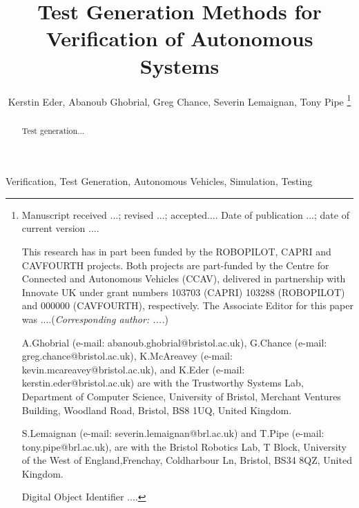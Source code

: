 \documentclass[letterpaper, 10 pt, journal, twoside]{IEEEtran}
\begin{document}
\title{Test Generation Methods for Verification of Autonomous Systems}

\author{Kerstin Eder, Abanoub Ghobrial, Greg Chance, Severin Lemaignan, Tony Pipe  
\thanks{{\footnotesize
Manuscript  
received ...;
revised ...;  
accepted.... 
Date of publication ...;
date of current version ....

This research has in part been funded by the ROBOPILOT, CAPRI and CAVFOURTH projects. Both projects are part-funded by the Centre for Connected and Autonomous Vehicles (CCAV), delivered in partnership with Innovate UK under grant numbers 103703 (CAPRI) 103288 (ROBOPILOT) and 000000 (CAVFOURTH), respectively.
The Associate Editor for this paper was ....(\textit{Corresponding author: ....})

A.Ghobrial (e-mail: abanoub.ghobrial@bristol.ac.uk), 
G.Chance (e-mail: greg.chance@bristol.ac.uk), 
K.McAreavey (e-mail: kevin.mcareavey@bristol.ac.uk), 
and 
K.Eder (e-mail: kerstin.eder@bristol.ac.uk) 
are with the Trustworthy Systems Lab, Department of Computer Science, University of Bristol, Merchant Ventures Building, Woodland Road,  Bristol, BS8 1UQ, United Kingdom. 

S.Lemaignan (e-mail: severin.lemaignan@brl.ac.uk)
and
T.Pipe (e-mail: tony.pipe@brl.ac.uk), 
are with the Bristol Robotics Lab, T Block, University of the West of England,Frenchay, Coldharbour Ln, Bristol, BS34 8QZ, United Kingdom. 

Digital Object Identifier ....
}}}


\maketitle
%
\begin{abstract}
\noindent 
Test generation...
        
\end{abstract}

\begin{IEEEkeywords}
Verification, Test Generation, Autonomous Vehicles, Simulation, Testing
\end{IEEEkeywords}
\IEEEpeerreviewmaketitle
\end{document}
